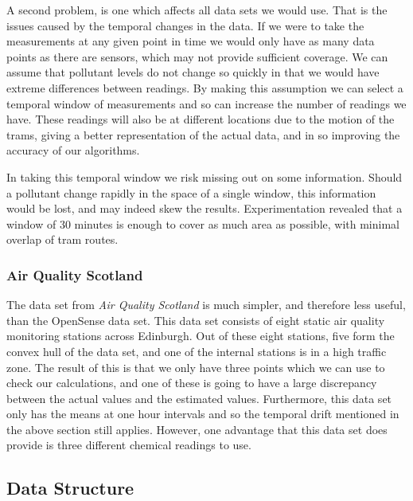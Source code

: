 				A second problem, is one which affects all data sets we would use. That is the issues caused by the temporal changes in the data. If we were to take the measurements at any given point in time we would only have as many data points as there are sensors, which may not provide sufficient coverage. We can assume that pollutant levels do not change so quickly in that we would have extreme differences between readings. By making this assumption we can select a temporal window of measurements and so can increase the number of readings we have. These readings will also be at different locations due to the motion of the trams, giving a better representation of the actual data, and in so improving the accuracy of our algorithms. 

				In taking this temporal window we risk missing out on some information. Should a pollutant change rapidly in the space of a single window, this information would be lost, and may indeed skew the results. Experimentation revealed that a window of 30 minutes is enough to cover as much area as possible, with minimal overlap of tram routes. 


			\subsubsection{Air Quality Scotland}\label{prediction_evaluation_methodology_data_sets_air_quality_scotland}

				The data set from \emph{Air Quality Scotland} is much simpler, and therefore less useful, than the OpenSense data set. This data set consists of eight static air quality monitoring stations across Edinburgh. Out of these eight stations, five form the convex hull of the data set, and one of the internal stations is in a high traffic zone. The result of this is that we only have three points which we can use to check our calculations, and one of these is going to have a large discrepancy between the actual values and the estimated values. Furthermore, this data set only has the means at one hour intervals and so the temporal drift mentioned in the above section still applies. However, one advantage that this data set does provide is three different chemical readings to use. 

		\subsection{Data Structure}\label{prediction_evaluation_methodology_data_structure}
			
